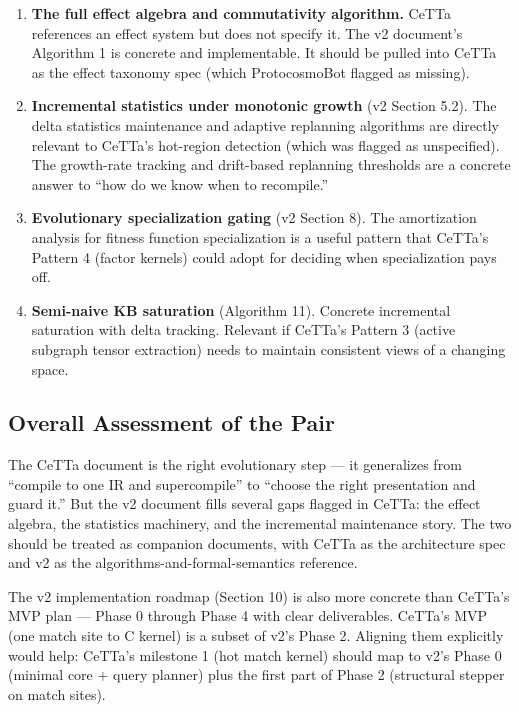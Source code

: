 \documentclass[11pt]{article}
\begin{document}
\begin{enumerate}
    \item \textbf{The full effect algebra and commutativity algorithm.} CeTTa references an effect system but does not specify it. The v2 document's Algorithm 1 is concrete and implementable. It should be pulled into CeTTa as the effect taxonomy spec (which ProtocosmoBot flagged as missing).

    \item \textbf{Incremental statistics under monotonic growth} (v2 Section 5.2). The delta statistics maintenance and adaptive replanning algorithms are directly relevant to CeTTa's hot-region detection (which was flagged as unspecified). The growth-rate tracking and drift-based replanning thresholds are a concrete answer to ``how do we know when to recompile.''

    \item \textbf{Evolutionary specialization gating} (v2 Section 8). The amortization analysis for fitness function specialization is a useful pattern that CeTTa's Pattern 4 (factor kernels) could adopt for deciding when specialization pays off.

    \item \textbf{Semi-naive KB saturation} (Algorithm 11). Concrete incremental saturation with delta tracking. Relevant if CeTTa's Pattern 3 (active subgraph tensor extraction) needs to maintain consistent views of a changing space.
\end{enumerate}

\subsection{Overall Assessment of the Pair}

The CeTTa document is the right evolutionary step --- it generalizes from ``compile to one IR and supercompile'' to ``choose the right presentation and guard it.'' But the v2 document fills several gaps flagged in CeTTa: the effect algebra, the statistics machinery, and the incremental maintenance story. The two should be treated as companion documents, with CeTTa as the architecture spec and v2 as the algorithms-and-formal-semantics reference.

The v2 implementation roadmap (Section 10) is also more concrete than CeTTa's MVP plan --- Phase 0 through Phase 4 with clear deliverables. CeTTa's MVP (one match site to C kernel) is a subset of v2's Phase 2. Aligning them explicitly would help: CeTTa's milestone 1 (hot match kernel) should map to v2's Phase 0 (minimal core + query planner) plus the first part of Phase 2 (structural stepper on match sites).
\end{document}
